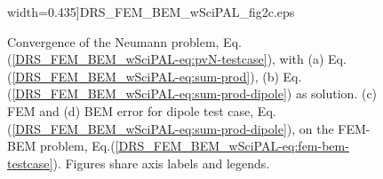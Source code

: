 \documentclass[runningheads]{lncse}
\begin{document}
\begin{figure}[t]
{     width=0.435\textwidth]{DRS_FEM_BEM_wSciPAL_fig2c.eps}
      \label{DRS_FEM_BEM_wSciPAL-fig:pg-2}
     }
  \caption{
   Convergence of the Neumann problem, Eq.(\ref{DRS_FEM_BEM_wSciPAL-eq:pvN-testcase}), with (a) Eq.(\ref{DRS_FEM_BEM_wSciPAL-eq:sum-prod}), 
 (b) Eq.(\ref{DRS_FEM_BEM_wSciPAL-eq:sum-prod-dipole}) as solution. 
 (c) FEM and (d) BEM error for dipole test case, Eq.(\ref{DRS_FEM_BEM_wSciPAL-eq:sum-prod-dipole}), on the FEM-BEM problem, Eq.(\ref{DRS_FEM_BEM_wSciPAL-eq:fem-bem-testcase}).
  Figures share axis labels and legends.
  }
  \label{DRS_FEM_BEM_wSciPAL-fig:convergence-plots}
 \end{figure}
%
\end{document}
